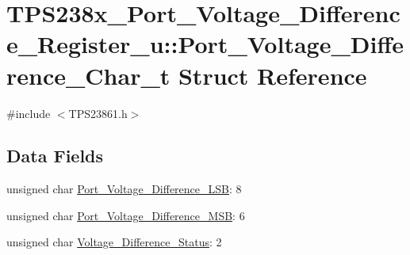 \hypertarget{struct_t_p_s238x___port___voltage___difference___register__u_1_1_port___voltage___difference___char__t}{\section{T\-P\-S238x\-\_\-\-Port\-\_\-\-Voltage\-\_\-\-Difference\-\_\-\-Register\-\_\-u\-:\-:Port\-\_\-\-Voltage\-\_\-\-Difference\-\_\-\-Char\-\_\-t Struct Reference}
\label{struct_t_p_s238x___port___voltage___difference___register__u_1_1_port___voltage___difference___char__t}
}


{\ttfamily \#include $<$T\-P\-S23861.\-h$>$}

\subsection*{Data Fields}
\begin{DoxyCompactItemize}
\item 
unsigned char \hyperlink{struct_t_p_s238x___port___voltage___difference___register__u_1_1_port___voltage___difference___char__t_ab15f154631caa2477f4f44fa85d1915a}{Port\-\_\-\-Voltage\-\_\-\-Difference\-\_\-\-L\-S\-B}\-: 8
\item 
unsigned char \hyperlink{struct_t_p_s238x___port___voltage___difference___register__u_1_1_port___voltage___difference___char__t_abbaed575fc79e4448d17e00c346b6c8a}{Port\-\_\-\-Voltage\-\_\-\-Difference\-\_\-\-M\-S\-B}\-: 6
\item 
unsigned char \hyperlink{struct_t_p_s238x___port___voltage___difference___register__u_1_1_port___voltage___difference___char__t_af6529862fcb9b2f73e93e182a995bd0e}{Voltage\-\_\-\-Difference\-\_\-\-Status}\-: 2
\end{DoxyCompactItemize}


